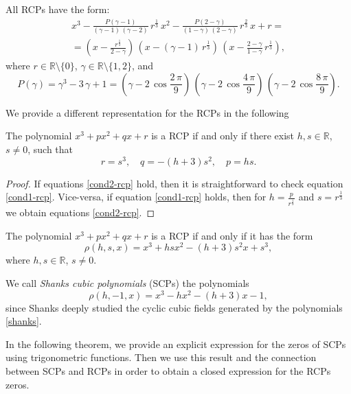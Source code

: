 \documentclass[12pt,reqno]{article}
\begin{document}
\begin{theorem}All RCPs have the form: 
\begin{multline*}
x^3 - \frac{P(\gamma-1)}{(\gamma-1)\, (\gamma-2)}\, r^{\frac{1}{3}}\, x^2 -
\frac{P(2-\gamma)}{(1-\gamma)\, (2-\gamma)}\, r^{\frac{2}{3}}\, x  + r = {}\\
{}=
\left( x - \frac{r^{\frac{1}{3}}}{2-\gamma} \right)\,
\left( x - (\gamma -1)\, r^{\frac{1}{3}}  \right)\,
\left( x - \frac{2-\gamma}{1-\gamma}\,r^{\frac{1}{3}} \right),
\end{multline*}
where $r\in \mathbb{R}\setminus \{0\}$,
$\gamma\in \mathbb{R}\setminus \{1,2\}$, and
$$
P(\gamma)=
\gamma^3 - 3\, \gamma + 1 =
\left( \gamma - 2\, \cos \frac{2\, \pi}{9} \right)\,
\left( \gamma - 2\, \cos \frac{4\, \pi}{9} \right)\,
\left( \gamma - 2\, \cos \frac{8\, \pi}{9} \right).
$$
\end{theorem}
 We provide a different representation for the RCPs in the following
\begin{theorem}
The polynomial $x^3+px^2+qx+r$ is a RCP if and only if there exist $h,s \in \mathbb R$, $s\not=0$, such that
\begin{equation} \label{cond2-rcp} r=s^3,\quad q=-(h+3)s^2,\quad p=hs.  \end{equation}
\end{theorem}
\begin{proof}
If equations \eqref{cond2-rcp} hold, then it is straightforward to check equation \eqref{cond1-rcp}. Vice-versa, if equation \eqref{cond1-rcp} holds, then for $h=\frac{p}{r^{\frac{1}{3}}}$ and $s=r^{\frac{1}{3}}$ we obtain equations \eqref{cond2-rcp}.
\end{proof}
\begin{corollary}
The polynomial $x^3+px^2+qx+r$ is a RCP if and only if it has the form
$$\rho(h,s,x)=x^3+hsx^2-(h+3)s^2x+s^3,$$
where $h,s\in\mathbb R$, $s\not=0$.
\end{corollary}
\begin{definition}
We call \emph{Shanks cubic polynomials} (SCPs) the polynomials
\begin{equation} \label{shanks} \rho(h,-1,x)=x^3-hx^2-(h+3)x-1,  \end{equation}
since Shanks \cite{Sha} deeply studied the cyclic cubic fields generated by the polynomials \eqref{shanks}.
\end{definition}
 In the following theorem, we provide an explicit expression for the zeros of SCPs using trigonometric functions. Then we use this result and the connection between SCPs and RCPs in order to obtain a closed expression for the RCPs zeros.
\end{document}
